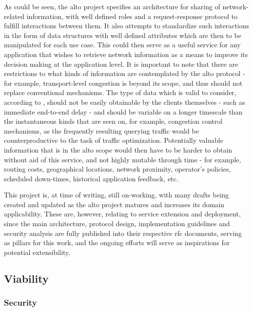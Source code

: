     As could be seen, the \gls{alto} project specifies an architecture for sharing of network-related information, with well defined roles and a request-response protocol to fulfill interactions between them.
    It also attempts to standardize such interactions in the form of data structures with well defined attributes which are then to be manipulated for each use case.
    This could then serve as a useful service for any application that wishes to retrieve network information as a means to improve its decision making at the application level.
    It is important to note that there are restrictions to what kinds of information are contemplated by the \gls{alto} protocol - for example, transport-level congestion is beyond its scope, and thus should not replace conventional mechanisms.
    The type of data which is valid to consider, according to \cite{alto-problem-statement}, should not be easily obtainable by the clients themselves - such as immediate end-to-end delay - and should be variable on a longer timescale than the instantaneous kinds that are seen on, for example, congestion control mechanisms, as the frequently resulting querying traffic would be counterproductive to the task of traffic optimization.
    Potentially valuable information that is in the \gls{alto} scope would then have to be harder to obtain without aid of this service, and not highly mutable through time - for example, routing costs, geographical locations, network proximity, operator's policies, scheduled down-times, historical application feedback, etc.

    This project is, at time of writing, still on-working, with many drafts being created and updated as the \gls{alto} project matures and increases its domain applicability.
    These are, however, relating to service extension and deployment, since the main architecture, protocol design, implementation guidelines and security analysis are fully published into their respective \gls{rfc} documents, serving as pillars for this work, and the ongoing efforts will serve as inspirations for potential extensibility.

\subsection{Viability}

\subsubsection{Security}
\label{sssec:alto-security}

